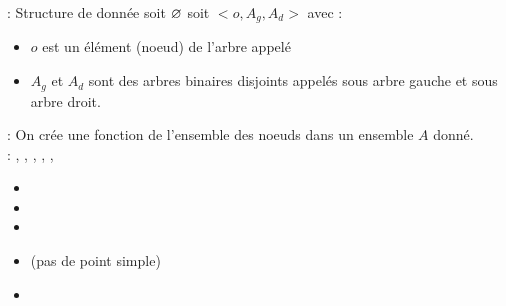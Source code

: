  : Structure de donnée soit $\varnothing$ soit $<o,A_g,A_d>$ avec : 
\begin{itemize}
	\item $o$ est un élément (noeud) de l'arbre appelé 
	\item $A_g$ et $A_d$ sont des arbres binaires disjoints appelés sous arbre gauche et sous arbre droit.
\end{itemize} 

 : On crée une fonction de l'ensemble des noeuds dans un ensemble $A$ donné. \\

 :
	,
	,
	,
	,
	,
\\

 \begin{itemize}
	\item {}
	\item {}
	\item {}
	\item {} (pas de point simple)
	\item {}
\end{itemize}


